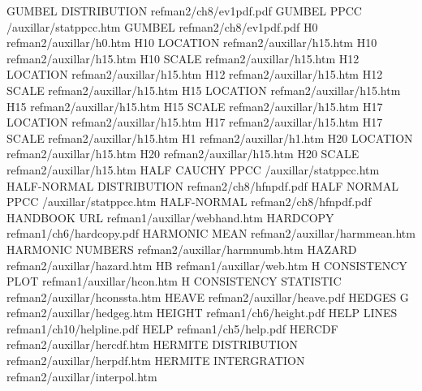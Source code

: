 GUMBEL DISTRIBUTION                     refman2/ch8/ev1pdf.pdf
GUMBEL PPCC                             /auxillar/statppcc.htm
GUMBEL                                  refman2/ch8/ev1pdf.pdf
H0                                      refman2/auxillar/h0.htm
H10 LOCATION                            refman2/auxillar/h15.htm
H10                                     refman2/auxillar/h15.htm
H10 SCALE                               refman2/auxillar/h15.htm
H12 LOCATION                            refman2/auxillar/h15.htm
H12                                     refman2/auxillar/h15.htm
H12 SCALE                               refman2/auxillar/h15.htm
H15 LOCATION                            refman2/auxillar/h15.htm
H15                                     refman2/auxillar/h15.htm
H15 SCALE                               refman2/auxillar/h15.htm
H17 LOCATION                            refman2/auxillar/h15.htm
H17                                     refman2/auxillar/h15.htm
H17 SCALE                               refman2/auxillar/h15.htm
H1                                      refman2/auxillar/h1.htm
H20 LOCATION                            refman2/auxillar/h15.htm
H20                                     refman2/auxillar/h15.htm
H20 SCALE                               refman2/auxillar/h15.htm
HALF CAUCHY PPCC                        /auxillar/statppcc.htm
HALF-NORMAL DISTRIBUTION                refman2/ch8/hfnpdf.pdf
HALF NORMAL PPCC                        /auxillar/statppcc.htm
HALF-NORMAL                             refman2/ch8/hfnpdf.pdf
HANDBOOK URL                            refman1/auxillar/webhand.htm
HARDCOPY                                refman1/ch6/hardcopy.pdf
HARMONIC MEAN                           refman2/auxillar/harmmean.htm
HARMONIC NUMBERS                        refman2/auxillar/harmnumb.htm
HAZARD                                  refman2/auxillar/hazard.htm
HB                                      refman1/auxillar/web.htm
H CONSISTENCY PLOT                      refman1/auxillar/hcon.htm
H CONSISTENCY STATISTIC                 refman2/auxillar/hconssta.htm
HEAVE                                   refman2/auxillar/heave.pdf
HEDGES G                                refman2/auxillar/hedgeg.htm
HEIGHT                                  refman1/ch6/height.pdf
HELP LINES                              refman1/ch10/helpline.pdf
HELP                                    refman1/ch5/help.pdf
HERCDF                                  refman2/auxillar/hercdf.htm
HERMITE DISTRIBUTION                    refman2/auxillar/herpdf.htm
HERMITE INTERGRATION                    refman2/auxillar/interpol.htm

